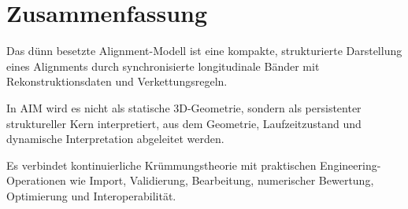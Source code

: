\section{Zusammenfassung}

\begin{summary}
Das dünn besetzte Alignment-Modell ist eine kompakte, strukturierte Darstellung
eines Alignments durch synchronisierte longitudinale Bänder mit
Rekonstruktionsdaten und Verkettungsregeln.

In AIM wird es nicht als statische 3D-Geometrie, sondern als persistenter
struktureller Kern interpretiert, aus dem Geometrie, Laufzeitzustand und
dynamische Interpretation abgeleitet werden.

Es verbindet kontinuierliche Krümmungstheorie mit praktischen
Engineering-Operationen wie Import, Validierung, Bearbeitung, numerischer
Bewertung, Optimierung und Interoperabilität.
\end{summary}
